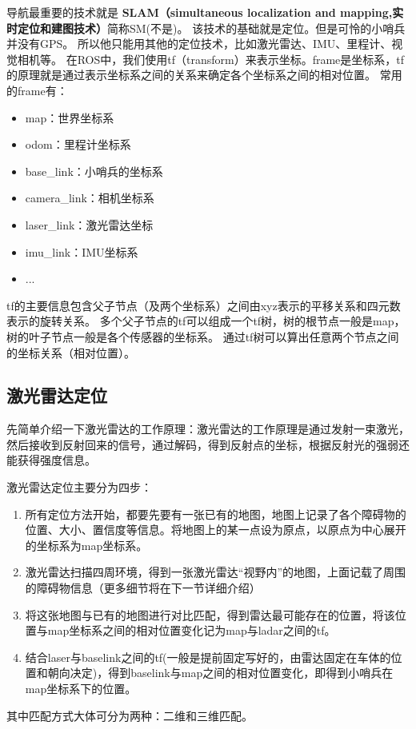 导航最重要的技术就是
\textbf{SLAM（simultaneous localization and mapping,实时定位和建图技术）}简称SM(不是)。
该技术的基础就是定位。但是可怜的小哨兵并没有GPS。
所以他只能用其他的定位技术，比如激光雷达、IMU、里程计、视觉相机等。
在ROS中，我们使用tf（transform）来表示坐标。frame是坐标系，tf的原理就是通过表示坐标系之间的关系来确定各个坐标系之间的相对位置。
常用的frame有：
\begin{itemize}
\item map：世界坐标系
\item odom：里程计坐标系
\item base\_link：小哨兵的坐标系
\item camera\_link：相机坐标系
\item laser\_link：激光雷达坐标
\item imu\_link：IMU坐标系
\item ...
\end{itemize}

tf的主要信息包含父子节点（及两个坐标系）之间由xyz表示的平移关系和四元数表示的旋转关系。
多个父子节点的tf可以组成一个tf树，树的根节点一般是map，树的叶子节点一般是各个传感器的坐标系。
通过tf树可以算出任意两个节点之间的坐标关系（相对位置）。

\subsection{\quad 激光雷达定位}
先简单介绍一下激光雷达的工作原理：激光雷达的工作原理是通过发射一束激光，然后接收到反射回来的信号，通过解码，得到反射点的坐标，根据反射光的强弱还能获得强度信息。

激光雷达定位主要分为四步：
\begin{enumerate}
\item 所有定位方法开始，都要先要有一张已有的地图，地图上记录了各个障碍物的位置、大小、置信度等信息。将地图上的某一点设为原点，以原点为中心展开的坐标系为map坐标系。
\item 激光雷达扫描四周环境，得到一张激光雷达“视野内”的地图，上面记载了周围的障碍物信息（更多细节将在下一节详细介绍）
\item 将这张地图与已有的地图进行对比匹配，得到雷达最可能存在的位置，将该位置与map坐标系之间的相对位置变化记为map与ladar之间的tf。
\item 结合laser与baselink之间的tf(一般是提前固定写好的，由雷达固定在车体的位置和朝向决定)，得到baselink与map之间的相对位置变化，即得到小哨兵在map坐标系下的位置。
\end{enumerate}
其中匹配方式大体可分为两种：二维和三维匹配。

